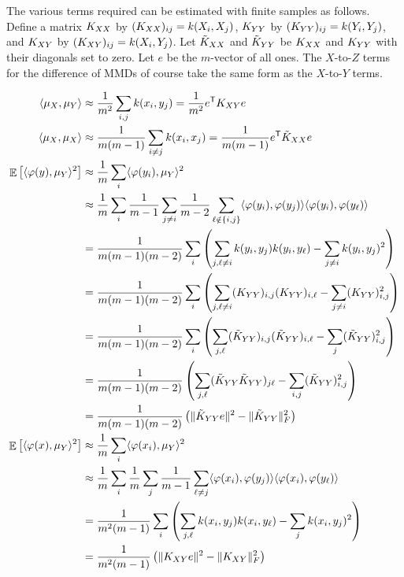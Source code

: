\documentclass{article}
\DeclareMathOperator{\E}{\mathbb{E}}
\newcommand{\tp}{^\mathsf{T}}
\begin{document}
The various terms required can be estimated with finite samples as follows.
Define a matrix $K_{XX}$ by $(K_{XX})_{ij} = k(X_i, X_j)$,
$K_{YY}$ by $(K_{YY})_{ij} = k(Y_i, Y_j)$,
and $K_{XY}$ by $(K_{XY})_{ij} = k(X_i, Y_j)$.
Let $\tilde K_{XX}$ and $\tilde K_{YY}$ be $K_{XX}$ and $K_{YY}$ with their diagonals set to zero.
Let $e$ be the $m$-vector of all ones.
The $X$-to-$Z$ terms for the difference of MMDs of course take the same form as the $X$-to-$Y$ terms.

\begin{align*}
\langle \mu_X, \mu_Y \rangle
&\approx \frac{1}{m^2} \sum_{i,j} k(x_i, y_j)
   = \frac{1}{m^2} e\tp \Kxy e
\\
\langle \mu_X, \mu_X \rangle
&\approx \frac{1}{m (m-1)} \sum_{i \ne j} k(x_i, x_j)
   = \frac{1}{m (m-1)} e\tp \Ktxx e
\\
\E\left[ \langle \varphi(y), \mu_Y \rangle^2 \right]
&\approx \frac1m \sum_i \langle \varphi(y_i), \mu_Y \rangle^2
\\&\approx \frac1m \sum_i \frac{1}{m-1} \sum_{j\ne i} \frac{1}{m-2} \sum_{\ell \notin \{i,j\}} \langle \varphi(y_i), \varphi(y_j) \rangle \langle \varphi(y_i), \varphi(y_\ell) \rangle
\\&= \frac{1}{m(m-1)(m-2)} \sum_i \left( \sum_{j, \ell \ne i} k(y_i, y_j) k(y_i, y_\ell) - \sum_{j \ne i} k(y_i, y_j)^2 \right)
\\&= \frac{1}{m(m-1)(m-2)} \sum_i \left( \sum_{j, \ell \ne i} (\Kyy)_{i,j} (\Kyy)_{i,\ell} - \sum_{j \ne i} (\Kyy)_{i,j}^2 \right)
\\&= \frac{1}{m(m-1)(m-2)} \sum_i \left( \sum_{j, \ell} (\Ktyy)_{i,j} (\Ktyy)_{i,\ell} - \sum_{j} (\Ktyy)_{i,j}^2 \right)
\\&= \frac{1}{m(m-1)(m-2)} \left( \sum_{j, \ell} (\Ktyy \Ktyy)_{j\ell} - \sum_{i,j} (\Ktyy)_{i,j}^2 \right)
\\&= \frac{1}{m(m-1)(m-2)} \left( \lVert \Ktyy e \rVert^2 - \lVert \Ktyy \rVert_F^2 \right)
\\
\E\left[ \langle \varphi(x), \mu_Y \rangle^2 \right]
&\approx \frac1m \sum_i \langle \varphi(x_i), \mu_Y \rangle^2
\\&\approx \frac1m \sum_i \frac{1}{m} \sum_{j} \frac{1}{m-1} \sum_{\ell \ne j} \langle \varphi(x_i), \varphi(y_j) \rangle \langle \varphi(x_i), \varphi(y_\ell) \rangle
\\&= \frac{1}{m^2(m-1)} \sum_i \left( \sum_{j, \ell} k(x_i, y_j) k(x_i, y_\ell) - \sum_{j} k(x_i, y_j)^2 \right)
\\&= \frac{1}{m^2(m-1)} \left( \lVert \Kxy e \rVert^2 - \lVert \Kxy \rVert_F^2 \right)

\end{align*}
\end{document}
